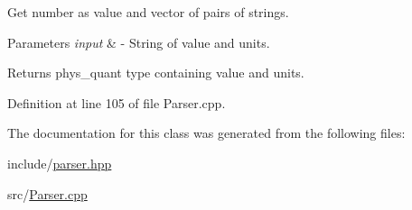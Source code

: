 Get number as value and vector of pairs of strings. 


\begin{DoxyParams}{Parameters}
{\em input} & -\/ String of value and units. \\
\hline
\end{DoxyParams}
\begin{DoxyReturn}{Returns}
phys\+\_\+quant type containing value and units. 
\end{DoxyReturn}


Definition at line 105 of file Parser.\+cpp.



The documentation for this class was generated from the following files\+:\begin{DoxyCompactItemize}
\item 
include/\hyperlink{parser_8hpp}{parser.\+hpp}\item 
src/\hyperlink{_parser_8cpp}{Parser.\+cpp}\end{DoxyCompactItemize}
